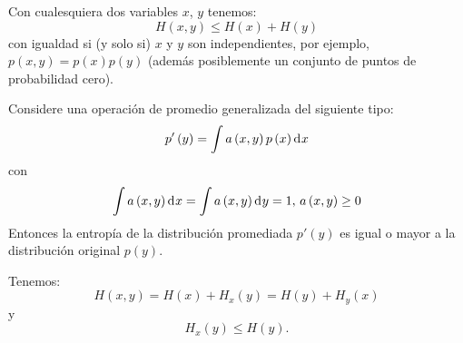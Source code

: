 \item{Con cualesquiera dos variables $x$, $y$ tenemos:
\begin{equation}
H\left ( x,y \right )\leq H\left ( x \right )+H\left ( y \right )
\end{equation}
con igualdad si (y solo si) $x$ y $y$ son independientes, por ejemplo,
$p\left ( x,y \right )=p\left ( x \right )p\left ( y \right )$
(adem\'as posiblemente un conjunto de puntos de probabilidad cero).}
\item{Considere una operaci\'on de promedio generalizada del siguiente tipo:
\begin{equation}
{p}'\left ( y \right )=\int a\left ( x,y \right )p\left ( x \right ) \diff x 
\end{equation}
con
\begin{equation}
\int a\left ( x,y \right ) \diff x =\int a\left ( x,y \right ) \diff y =1, 
\,  a\left ( x,y \right )\geq 0
\end{equation}
Entonces la entrop\'ia de la distribuci\'on promediada ${p}'\left ( y
\right )$ es igual o mayor a la distribuci\'on original $p\left
( y \right )$.}
\item{Tenemos:
\begin{equation}
H\left ( x,y \right )=H\left ( x \right )+H_{x}\left ( y \right )=H\left ( y \right )+H_{y}\left ( x \right )
\end{equation}
y
\begin{equation}
H_x{}\left ( y \right )\leq H\left ( y \right ).
\end{equation}}
